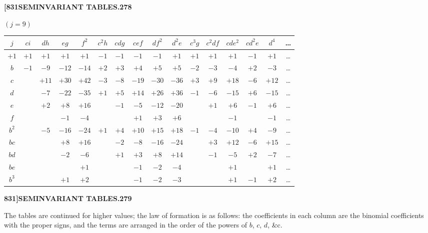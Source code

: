 \documentclass[11pt,a4paper]{book}
\begin{document}
\newpage
\setcounter{page}{278}

\noindent\textbf{[831}\hfill\textbf{SEMINVARIANT TABLES.}\hfill\textbf{278}

\bigskip

\noindent $(j = 9)$
\begin{center}
\small
\begin{tabular}{|c|c|c|c|c|c|c|c|c|c|c|c|c|c|c|c|}
\hline
$j$ & $ci$ & $dh$ & $eg$ & $f^2$ & $c^2h$ & $cdg$ & $cef$ & $df^2$ & $d^2e$ & $c^3g$ & $c^2df$ & $cde^2$ & $cd^2e$ & $d^4$ & \dots \\
\hline
$+1$ & $+1$ & $+1$ & $+1$ & $+1$ & $-1$ & $-1$ & $-1$ & $-1$ & $+1$ & $+1$ & $+1$ & $+1$ & $-1$ & $+1$ & \dots \\
$b$ & $-1$ & $-9$ & $-12$ & $-14$ & $+2$ & $+3$ & $+4$ & $+5$ & $+5$ & $-2$ & $-3$ & $-4$ & $+2$ & $-3$ & \dots \\
$c$ & & $+11$ & $+30$ & $+42$ & $-3$ & $-8$ & $-19$ & $-30$ & $-36$ & $+3$ & $+9$ & $+18$ & $-6$ & $+12$ & \dots \\
$d$ & & $-7$ & $-22$ & $-35$ & $+1$ & $+5$ & $+14$ & $+26$ & $+36$ & $-1$ & $-6$ & $-15$ & $+6$ & $-15$ & \dots \\
$e$ & & $+2$ & $+8$ & $+16$ & & $-1$ & $-5$ & $-12$ & $-20$ & & $+1$ & $+6$ & $-1$ & $+6$ & \dots \\
$f$ & & & $-1$ & $-4$ & & & $+1$ & $+3$ & $+6$ & & & $-1$ & & $-1$ & \dots \\
$b^2$ & & $-5$ & $-16$ & $-24$ & $+1$ & $+4$ & $+10$ & $+15$ & $+18$ & $-1$ & $-4$ & $-10$ & $+4$ & $-9$ & \dots \\
$bc$ & & & $+8$ & $+16$ & & $-2$ & $-8$ & $-16$ & $-24$ & & $+3$ & $+12$ & $-6$ & $+15$ & \dots \\
$bd$ & & & $-2$ & $-6$ & & $+1$ & $+3$ & $+8$ & $+14$ & & $-1$ & $-5$ & $+2$ & $-7$ & \dots \\
$be$ & & & & $+1$ & & & $-1$ & $-2$ & $-4$ & & & $+1$ & & $+1$ & \dots \\
$b^3$ & & & $+1$ & $+2$ & & & $-1$ & $-2$ & $-3$ & & & $+1$ & $-1$ & $+2$ & \dots \\
\hline
\end{tabular}
\end{center}

\newpage
\setcounter{page}{279}

\noindent\textbf{831]}\hfill\textbf{SEMINVARIANT TABLES.}\hfill\textbf{279}

\bigskip

\noindent The tables are continued for higher values; the law of formation is as follows: the coefficients in each column are the binomial coefficients with the proper signs, and the terms are arranged in the order of the powers of $b$, $c$, $d$, \&c.
\end{document}
